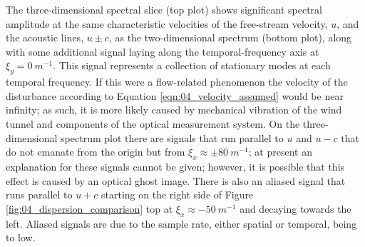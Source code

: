 The three-dimensional spectral slice (top plot) shows significant spectral amplitude at the same characteristic velocities of the free-stream velocity, $u$, and the acoustic lines, $u\pm c$, as the two-dimensional spectrum (bottom plot), along with some additional signal laying along the temporal-frequency axis at $\xi_y=0\ m^{-1}$.
This signal represents a collection of stationary modes at each temporal frequency.
If this were a flow-related phenomenon the velocity of the disturbance according to Equation \ref{eqn:04_velocity_assumed} would be near infinity; as such, it is more likely caused by mechanical vibration of the wind tunnel and components of the optical measurement system.
On the three-dimensional spectrum plot there are signals that run parallel to $u$ and $u-c$ that do not emanate from the origin but from $\xi_x\approx\pm80\ m^{-1}$; at present an explanation for these signals cannot be given; however, it is possible that this effect is caused by an optical ghost image.
There is also an aliased signal that runs parallel to $u+c$ starting on the right side of Figure \ref{fig:04_dispersion_comparison} top at $\xi_x\approx-50\ m^{-1}$ and decaying towards the left.
Aliased signals are due to the sample rate, either spatial or temporal, being to low.

